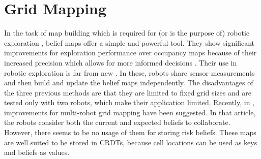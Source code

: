 \section{Grid Mapping}
In the task of map building which is required for (or is the purpose of) robotic exploration \cite{gutmann1999incremental,hahnel2002map}, belief maps offer a simple and powerful tool. They show significant improvements for exploration performance over occupancy maps because of their increased precision which allows for more informed decisions \cite{stachnissMappingExplorationMobile2003}. Their use in robotic exploration is far from new \cite{kobayashiSharingExploringInformation2002,kobayashiDeterminationExplorationTarget2003}. In these, robots share sensor measurements and then build and update the belief maps independently. The disadvantages of the three previous methods are that they are limited to fixed grid sizes and are tested only with two robots, which make their application limited. Recently, in \cite{indelmanCooperativeMultirobotBelief2018}, improvements for multi-robot grid mapping have been suggested. In that article, the robots consider both the current and expected beliefs to collaborate. However, there seems to be no usage of them for storing risk beliefs. These maps are well suited to be stored in \ac{CRDT}s, because cell locations can be used as keys and beliefs as values.